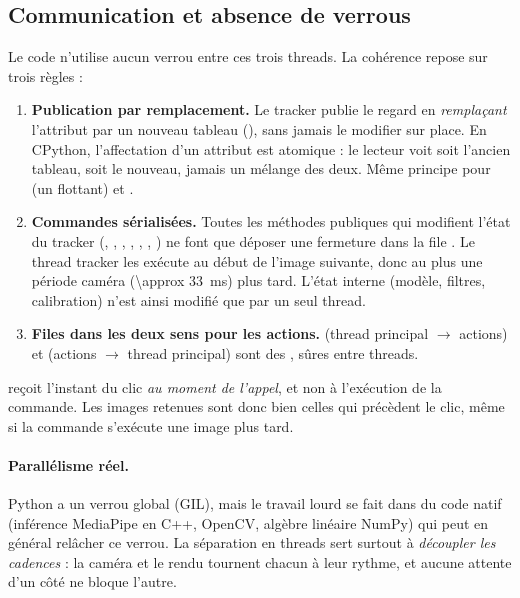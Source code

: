 \subsection{Communication et absence de verrous}
\label{sec:commandes}

Le code n'utilise aucun verrou entre ces trois threads. La cohérence repose sur trois règles :

\begin{enumerate}
  \item \textbf{Publication par remplacement.} Le tracker publie le regard en \emph{remplaçant} l'attribut par un nouveau tableau (), sans jamais le modifier sur place. En CPython, l'affectation d'un attribut est atomique : le lecteur voit soit l'ancien tableau, soit le nouveau, jamais un mélange des deux. Même principe pour  (un flottant) et .
  \item \textbf{Commandes sérialisées.} Toutes les méthodes publiques qui modifient l'état du tracker (, , , , , , ) ne font que déposer une fermeture dans la file . Le thread tracker les exécute au début de l'image suivante, donc au plus une période caméra (\qty{\approx 33}{\milli\second}) plus tard. L'état interne (modèle, filtres, calibration) n'est ainsi modifié que par un seul thread.
  \item \textbf{Files dans les deux sens pour les actions.}  (thread principal $\to$ actions) et  (actions $\to$ thread principal) sont des , sûres entre threads.
\end{enumerate}

\begin{attention}
 reçoit l'instant  du clic \emph{au moment de l'appel}, et non à l'exécution de la commande. Les images retenues sont donc bien celles qui précèdent le clic, même si la commande s'exécute une image plus tard.
\end{attention}

\paragraph{Parallélisme réel.} Python a un verrou global (GIL), mais le travail lourd se fait dans du code natif (inférence MediaPipe en C++, OpenCV, algèbre linéaire NumPy) qui peut en général relâcher ce verrou. La séparation en threads sert surtout à \emph{découpler les cadences} : la caméra et le rendu tournent chacun à leur rythme, et aucune attente d'un côté ne bloque l'autre.


